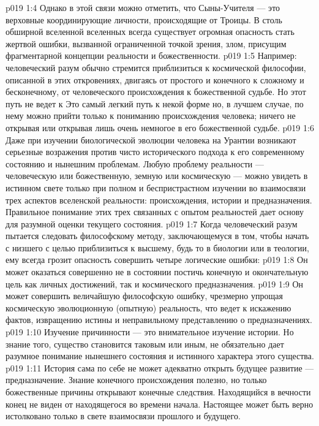 \vs p019 1:4 Однако в этой связи можно отметить, что Сыны\hyp{}Учителя --- это верховные координирующие личности, происходящие от Троицы. В столь обширной вселенной вселенных всегда существует огромная опасность стать жертвой ошибки, вызванной ограниченной точкой зрения, злом, присущим фрагментарной концепции реальности и божественности.
\vs p019 1:5 Например: человеческий разум обычно стремится приблизиться к космической философии, описанной в этих откровениях, двигаясь от простого и конечного к сложному и бесконечному, от человеческого происхождения к божественной судьбе. Но этот путь не ведет к  Это самый легкий путь к некой форме  но, в лучшем случае, по нему можно прийти только к пониманию происхождения человека; ничего не открывая или открывая лишь очень немногое в его божественной судьбе.
\vs p019 1:6 Даже при изучении биологической эволюции человека на Урантии возникают серьезные возражения против чисто исторического подхода к его современному состоянию и нынешним проблемам. Любую проблему реальности --- человеческую или божественную, земную или космическую --- можно увидеть в истинном свете только при полном и беспристрастном изучении во взаимосвязи трех аспектов вселенской реальности: происхождения, истории и предназначения. Правильное понимание этих трех связанных с опытом реальностей дает основу для разумной оценки текущего состояния.
\vs p019 1:7 \pc Когда человеческий разум пытается следовать философскому методу, заключающемуся в том, чтобы начать с низшего с целью приблизиться к высшему, будь то в биологии или в теологии, ему всегда грозит опасность совершить четыре логические ошибки:
\vs p019 1:8 \pc {}\bibnobreakspace Он может оказаться совершенно не в состоянии постичь конечную и окончательную цель как личных достижений, так и космического предназначения.
\vs p019 1:9 \pc {}\bibnobreakspace Он может совершить величайшую философскую ошибку, чрезмерно упрощая космическую эволюционную (опытную) реальность, что ведет к искажению фактов, извращению истины и неправильному представлению о предназначениях.
\vs p019 1:10 \pc {}\bibnobreakspace Изучение причинности --- это внимательное изучение истории. Но знание того,  существо становится таковым или иным, не обязательно дает разумное понимание нынешнего состояния и истинного характера этого существа.
\vs p019 1:11 \pc {}\bibnobreakspace История сама по себе не может адекватно открыть будущее развитие --- предназначение. Знание конечного происхождения полезно, но только божественные причины открывают конечные следствия. Находящийся в вечности конец не виден от находящегося во времени начала. Настоящее может быть верно истолковано только в свете взаимосвязи прошлого и будущего.
